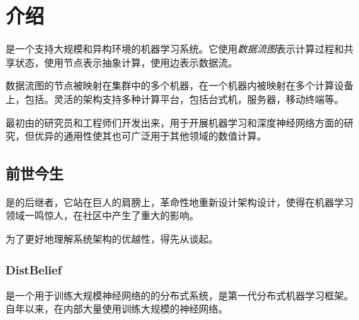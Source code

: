\begin{savequote}[45mm]
\end{savequote}

\chapter{介绍} 
\label{ch:introduction}

\begin{content}

是一个支持大规模和异构环境的机器学习系统。它使用\emph{数据流图}表示计算过程和共享状态，使用节点表示抽象计算，使用边表示数据流。

数据流图的节点被映射在集群中的多个机器，在一个机器内被映射在多个计算设备上，包括。灵活的架构支持多种计算平台，包括台式机，服务器，移动终端等。

\tf{}最初由的研究员和工程师们开发出来，用于开展机器学习和深度神经网络方面的研究，但\tf{}优异的通用性使其也可广泛用于其他领域的数值计算。

\end{content}

\section{前世今生}

\begin{content}

\tf{}是的后继者，它站在巨人的肩膀上，革命性地重新设计架构设计，使得\tf{}在机器学习领域一鸣惊人，在社区中产生了重大的影响。

为了更好地理解\tf{}系统架构的优越性，得先从谈起。

\end{content}

\subsection{DistBelief}

\begin{content}

是一个用于训练大规模神经网络的的分布式系统，是第一代分布式机器学习框架。自年以来，在内部大量使用训练大规模的神经网络。

\end{content}

